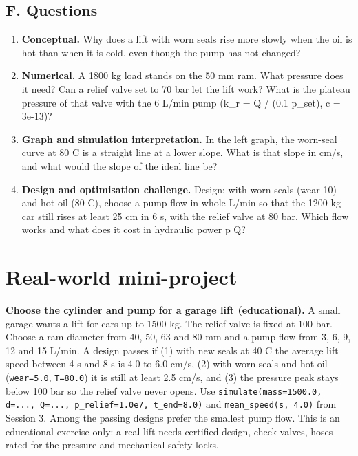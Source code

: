 \documentclass[11pt,a4paper]{article}
\begin{document}
\subsection*{F. Questions}
\begin{enumerate}[nosep]
\item \textbf{Conceptual.} Why does a lift with worn seals rise more slowly when the oil is hot than when it is cold, even though the pump has not changed?
\item \textbf{Numerical.} A 1800 kg load stands on the 50 mm ram. What pressure does it need? Can a relief valve set to 70 bar let the lift work? What is the plateau pressure of that valve with the 6 L/min pump (k\_r = Q / (0.1 p\_set), c = 3e-13)?
\item \textbf{Graph and simulation interpretation.} In the left graph, the worn-seal curve at 80 C is a straight line at a lower slope. What is that slope in cm/s, and what would the slope of the ideal line be?
\item \textbf{Design and optimisation challenge.} Design: with worn seals (wear 10) and hot oil (80 C), choose a pump flow in whole L/min so that the 1200 kg car still rises at least 25 cm in 6 s, with the relief valve at 80 bar. Which flow works and what does it cost in hydraulic power p Q?
\end{enumerate}

\section{Real-world mini-project}
\textbf{Choose the cylinder and pump for a garage lift (educational).} A small garage wants a lift for cars up to 1500 kg. The relief valve is fixed at 100 bar. Choose a ram diameter from 40, 50, 63 and 80 mm and a pump flow from 3, 6, 9, 12 and 15 L/min. A design passes if (1) with new seals at 40 C the average lift speed between 4 s and 8 s is 4.0 to 6.0 cm/s, (2) with worn seals and hot oil (\texttt{wear=5.0}, \texttt{T=80.0}) it is still at least 2.5 cm/s, and (3) the pressure peak stays below 100 bar so the relief valve never opens. Use \texttt{simulate(mass=1500.0, d=..., Q=..., p\_relief=1.0e7, t\_end=8.0)} and \texttt{mean\_speed(s, 4.0)} from Session 3. Among the passing designs prefer the smallest pump flow. This is an educational exercise only: a real lift needs certified design, check valves, hoses rated for the pressure and mechanical safety locks.
\end{document}

